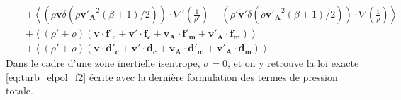 \begin{equation}
{\begin{array}{lcl}
&&+ \left< \left(\rho\boldsymbol{v} \delta \left(\rho\boldsymbol{v'_A}^2\left(\beta +1\right)/2\right) \right) \cdot \nabla'\left(\frac{1}{\rho'}\right) - \left(\rho' \boldsymbol{v'}\delta \left(\rho\boldsymbol{v'_A}^2\left(\beta +1\right)/2\right) \right) \cdot \nabla \left(\frac{1}{\rho}\right)\right>\\%
&&+  \left<\left(\rho' + \rho\right)\left(\boldsymbol{v} \cdot \boldsymbol{f'_c} + \boldsymbol{v'} \cdot \boldsymbol{f_c} + \boldsymbol{v_A} \cdot \boldsymbol{f'_m} + \boldsymbol{v'_A} \cdot \boldsymbol{f_m}\right) \right>\\%
&&+ \left<\left(\rho' + \rho\right)\left(\boldsymbol{v} \cdot \boldsymbol{d'_c} + \boldsymbol{v'} \cdot \boldsymbol{d_c}+\boldsymbol{v_A} \cdot \boldsymbol{d'_m} + \boldsymbol{v'_A} \cdot \boldsymbol{d_m}\right)\right> .
\end{array}}
\end{equation}
 Dans le cadre d'une zone inertielle isentrope, $\sigma=0$, et on y retrouve la loi exacte \eqref{eq:turb_elpol_f2} écrite avec la dernière formulation des termes de pression totale. 
 
